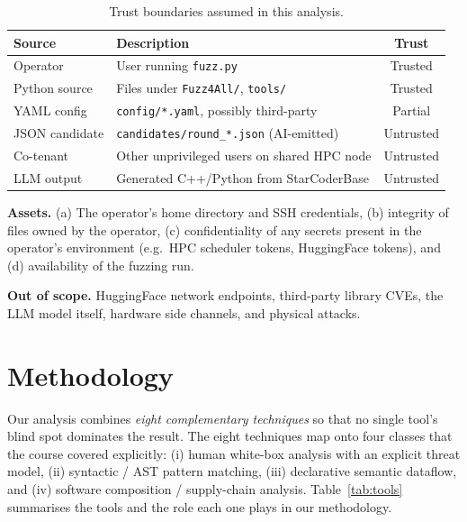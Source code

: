 \documentclass[conference]{IEEEtran}
\begin{document}
\begin{table}[t]
\caption{Trust boundaries assumed in this analysis.}
\label{tab:trust}
\centering\renewcommand{\arraystretch}{1.15}
\begin{tabularx}{\columnwidth}{lXc}
\toprule
\textbf{Source} & \textbf{Description} & \textbf{Trust} \\
\midrule
Operator      & User running \texttt{fuzz.py}                  & Trusted \\
Python source & Files under \texttt{Fuzz4All/}, \texttt{tools/} & Trusted \\
YAML config   & \texttt{config/*.yaml}, possibly third-party   & Partial \\
JSON candidate& \texttt{candidates/round\_*.json} (AI-emitted) & Untrusted \\
Co-tenant     & Other unprivileged users on shared HPC node    & Untrusted \\
LLM output    & Generated C++/Python from StarCoderBase        & Untrusted \\
\bottomrule
\end{tabularx}
\end{table}

\textbf{Assets.} (a) The operator's home directory and SSH credentials,
(b) integrity of files owned by the operator, (c) confidentiality of any
secrets present in the operator's environment (e.g.\ HPC scheduler tokens,
HuggingFace tokens), and (d) availability of the fuzzing run.

\textbf{Out of scope.} HuggingFace network endpoints, third-party
library CVEs, the LLM model itself, hardware side channels, and physical
attacks.

\section{Methodology}

Our analysis combines \emph{eight complementary techniques} so that no
single tool's blind spot dominates the result. The eight techniques map
onto four classes that the course covered explicitly: (i) human
white-box analysis with an explicit threat model, (ii) syntactic / AST
pattern matching, (iii) declarative semantic dataflow, and (iv) software
composition / supply-chain analysis. Table~\ref{tab:tools} summarises
the tools and the role each one plays in our methodology.
\end{document}
